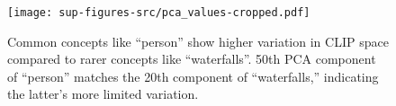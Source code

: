 \begin{figure}[!htpb]
    \centering
    \texttt{[image: sup-figures-src/pca\_values-cropped.pdf]}
    \caption{Common concepts like ``person'' show higher variation in CLIP space compared to rarer concepts like ``waterfalls''. 50th PCA component of ``person'' matches the 20th component of ``waterfalls,'' indicating the latter's more limited variation.} 
    \label{fig:pca}
\end{figure}
\vspace{-2em}